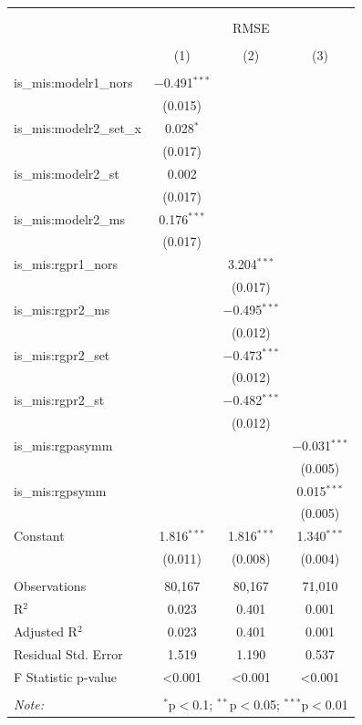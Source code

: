 \begin{tabular}{@{\extracolsep{5pt}}lccc} 
\\[-1.8ex]\hline 
\hline \\[-1.8ex] 
\\[-1.8ex] & \multicolumn{3}{c}{RMSE} \\ 
\\[-1.8ex] & (1) & (2) & (3)\\ 
\hline \\[-1.8ex] 
 is\_mis:modelr1\_nors & $-$0.491$^{***}$ &  &  \\ 
  & (0.015) &  &  \\ 
  is\_mis:modelr2\_set\_x & 0.028$^{*}$ &  &  \\ 
  & (0.017) &  &  \\ 
  is\_mis:modelr2\_st & 0.002 &  &  \\ 
  & (0.017) &  &  \\ 
  is\_mis:modelr2\_ms & 0.176$^{***}$ &  &  \\ 
  & (0.017) &  &  \\ 
  is\_mis:rgpr1\_nors &  & 3.204$^{***}$ &  \\ 
  &  & (0.017) &  \\ 
  is\_mis:rgpr2\_ms &  & $-$0.495$^{***}$ &  \\ 
  &  & (0.012) &  \\ 
  is\_mis:rgpr2\_set &  & $-$0.473$^{***}$ &  \\ 
  &  & (0.012) &  \\ 
  is\_mis:rgpr2\_st &  & $-$0.482$^{***}$ &  \\ 
  &  & (0.012) &  \\ 
  is\_mis:rgpasymm &  &  & $-$0.031$^{***}$ \\ 
  &  &  & (0.005) \\ 
  is\_mis:rgpsymm &  &  & 0.015$^{***}$ \\ 
  &  &  & (0.005) \\ 
  Constant & 1.816$^{***}$ & 1.816$^{***}$ & 1.340$^{***}$ \\ 
  & (0.011) & (0.008) & (0.004) \\ 
 \hline \\[-1.8ex] 
Observations & 80,167 & 80,167 & 71,010 \\ 
R$^{2}$ & 0.023 & 0.401 & 0.001 \\ 
Adjusted R$^{2}$ & 0.023 & 0.401 & 0.001 \\ 
Residual Std. Error & 1.519 & 1.190 & 0.537 \\ 
F Statistic p-value & <0.001 & <0.001 & <0.001 \\ 
\hline 
\hline \\[-1.8ex] 
\textit{Note:}  & \multicolumn{3}{r}{$^{*}$p$<$0.1; $^{**}$p$<$0.05; $^{***}$p$<$0.01} \\ 
\end{tabular} 
